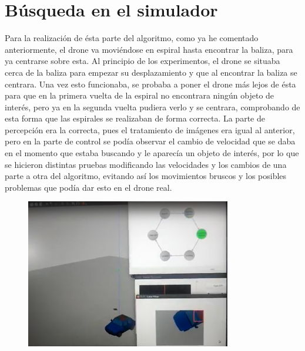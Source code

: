 \section{B\'usqueda en el simulador}
\hspace{1cm} Para la realizaci\'on de \'esta parte del algoritmo, como ya he comentado anteriormente, el drone va movi\'endose en espiral hasta encontrar la baliza, para ya centrarse sobre esta. Al principio de los experimentos, el drone se situaba cerca de la baliza para empezar su desplazamiento y que al encontrar la baliza se centrara. Una vez esto funcionaba, se probaba a poner el drone m\'as lejos de \'esta para que en la primera vuelta de la espiral no encontrara ning\'un objeto de inter\'es, pero ya en la segunda vuelta pudiera verlo y se centrara, comprobando de esta forma que las espirales se realizaban de forma correcta. La parte de percepci\'on era la correcta, pues el tratamiento de im\'agenes era igual al anterior, pero en la parte de control se pod\'ia observar el cambio de velocidad que se daba en el momento que estaba buscando y le aparec\'ia un objeto de inter\'es, por lo que se hicieron distintas pruebas modificando las velocidades y los cambios de una parte a otra del algoritmo, evitando as\'i los movimientos bruscos y los posibles problemas que pod\'ia dar esto en el drone real. 

\begin{figure}[H]
	\centering
		\includegraphics[width=0.8\textwidth]{imgs/search_simulate.jpg}
	\label{fig:Despegue sobre la baliza del coche.}
\end{figure}

